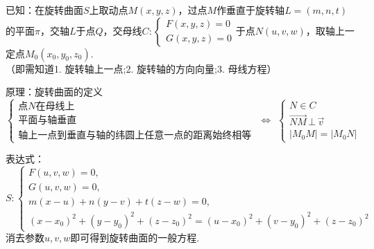 \ttheorem[旋转曲面的一般方程]
\par {\color{dy}已知}：在旋转曲面$S$上取动点$M(x,y,z)$，过点$M$作垂直于旋转轴$L=(m,n,t)$的平面$\pi $，交轴$L$于点$Q$，交母线$
C:
\begin{cases}
	F(x,y,z)=0\\
	G(x,y,z)=0
\end{cases}
$于点$N(u,v,w)$，取轴上一定点$M_0(x_0,y_0,z_0)$.\\
（即需知道{\color{dl}1. 旋转轴上一点};{\color{dl}2. 旋转轴的方向向量};{\color{dl}3. 母线方程}）
\par {\color{dy}原理}：旋转曲面的定义
\begin{equation*}
\begin{cases}
\mbox{点}N\mbox{在母线上}\\
\mbox{平面与轴垂直}\\
\mbox{轴上一点到垂直与轴的纬圆上任意一点的距离始终相等}
\end{cases}
\,\, \Longleftrightarrow \, \,
\begin{cases}
N \in C \\
\overrightarrow{NM}  \, \bot \,  \overrightarrow{v}\\
|M_0M|=|M_0N|
\end{cases}
\end{equation*}
\par {\color{dy}表达式}：
\begin{equation}
S:
	\begin{cases}
	F(u,v,w)=0,\\
	G(u,v,w)=0,\\
	m(x-u)+n(y-v)+t(z-w)=0,\\
	(x-x_0)^2+(y-y_0)^2+(z-z_0)^2=(u-x_0)^2+(v-y_0)^2+(z-z_0)^2
	\end{cases}
\end{equation}
消去参数$u,v,w$即可得到旋转曲面的一般方程.

\newpage

